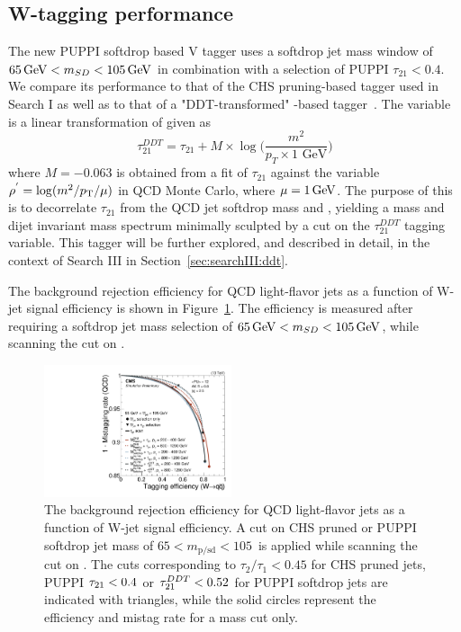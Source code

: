 \subsection{W-tagging performance}
\label{sec:searchII:vtagperf}
The new PUPPI softdrop based V tagger uses a softdrop jet mass window of $65 \,\text{Ge\hspace{-.08em}V} < m_{SD} < 105 \,\text{Ge\hspace{-.08em}V}$ in combination with a selection of PUPPI $\tau_{21}<0.4$.
We compare its performance to that of the CHS pruning-based tagger used in Search I as well as to that of a "DDT-transformed" \nsubj-based tagger~\cite{Dolen:2016kst}. The \ddt variable is a linear transformation of \nsubj given as
\begin{equation}
\label{eq:searchII:ddt}
\tau_{21}^{DDT} = \tau_{21} + M \times \log \bigg( \frac{m^2}{p_T \times 1 \textrm{ GeV}}\bigg)
\end{equation}
where $M=-0.063$ is obtained from a fit of $\tau_{21}$ against the variable $\rho^{'}=\log(m^2/p_{\mathrm{T}}/\mu)$ in QCD Monte Carlo, where $\mu = 1 \,\text{Ge\hspace{-.08em}V}$.
The purpose of this is to decorrelate $\tau_{21}$ from the QCD jet softdrop mass and \PT, yielding a mass and dijet invariant mass spectrum minimally sculpted by a cut on the $\tau_{21}^{DDT}$ tagging variable. This tagger will be further explored, and described in detail, in the context of Search III in Section~\ref{sec:searchIII:ddt}.\par
The background rejection efficiency for QCD light-flavor jets as a function of W-jet signal efficiency is shown in Figure~\ref{fig:searchII:roc}.
The efficiency is measured after requiring a softdrop jet mass selection of $65 \,\text{Ge\hspace{-.08em}V} < m_{SD} < 105 \,\text{Ge\hspace{-.08em}V}$, while scanning the cut on \nsubj.
\begin{figure}[h!]
\centering
\includegraphics[width=0.49\textwidth]{figures/vtagging/JME-16-003/BoostedW/roc_WqqvsQCD_2bins.pdf}
\caption{The background rejection efficiency for QCD light-flavor jets as a function of W-jet signal efficiency. A cut on CHS pruned or PUPPI softdrop jet mass of $65<m_{\mathrm{p/sd}}<105$~\GeV is applied while scanning the cut on \nsubj. The cuts corresponding to $\tau_2/\tau_1 < 0.45$ for CHS pruned jets, PUPPI $\tau_{21} < 0.4$ or $\tau_{21}^{DDT}<0.52$ for PUPPI softdrop jets are indicated with triangles, while the solid circles represent the efficiency and mistag rate for a mass cut only.}
\label{fig:searchII:roc}
\end{figure}
